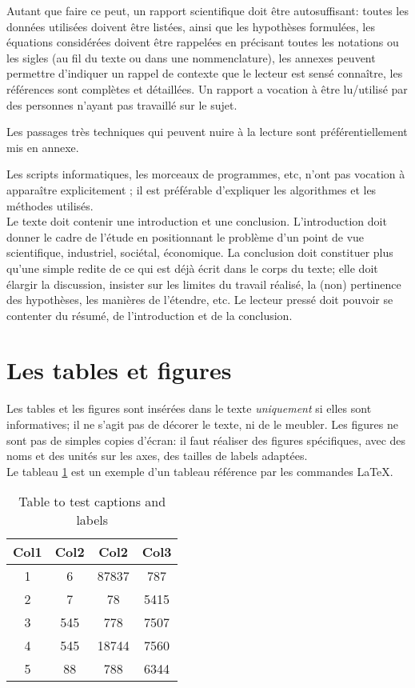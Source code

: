 \documentclass[a4paper,11pt]{paper}
\begin{document}
Autant que faire ce peut, un rapport scientifique doit être autosuffisant: toutes les données utilisées doivent être listées, ainsi que les hypothèses formulées, les équations considérées doivent être rappelées en précisant toutes les notations ou les sigles (au fil du texte ou dans une nommenclature), les annexes peuvent permettre d'indiquer un rappel de contexte que le lecteur est sensé connaître, les références sont complètes et détaillées. Un rapport a vocation à être lu/utilisé par des personnes n’ayant pas travaillé sur le sujet.

Les passages très techniques qui peuvent nuire à la lecture sont préférentiellement mis en annexe. 

Les scripts informatiques, les morceaux de programmes, etc, n'ont pas vocation à apparaître explicitement ; il est préférable d'expliquer les algorithmes et les méthodes utilisés.\\

Le texte doit contenir une introduction et une conclusion. L’introduction doit donner le cadre de l’étude en positionnant le problème d’un point de vue scientifique, industriel, sociétal, économique. La conclusion doit constituer plus qu’une simple redite de ce qui est déjà écrit dans le corps du texte; elle doit élargir la discussion, insister sur les limites du travail réalisé, la (non) pertinence des hypothèses, les manières de l’étendre, etc. Le lecteur pressé doit pouvoir se contenter du résumé, de l'introduction et de la conclusion. 

\section{Les tables et figures}

Les tables et les figures sont insérées dans le texte \emph{uniquement} si elles sont informatives; il ne s'agit pas de décorer le texte, ni de le meubler. Les figures ne sont pas de simples copies d’écran: il faut réaliser des figures spécifiques, avec des noms et des unités sur les axes, des tailles de labels adaptées. 
\\

Le tableau \ref{table:1} est un exemple d'un tableau référence par les commandes  \LaTeX.
 
\begin{table}[h!]
\centering
\begin{tabular}{||c c c c||} 
 \hline
 Col1 & Col2 & Col2 & Col3 \\ [0.5ex] 
 \hline\hline
 1 & 6 & 87837 & 787 \\ 
 2 & 7 & 78 & 5415 \\
 3 & 545 & 778 & 7507 \\
 4 & 545 & 18744 & 7560 \\
 5 & 88 & 788 & 6344 \\ [1ex] 
 \hline
\end{tabular}
\caption{Table to test captions and labels}
\label{table:1}
\end{table}
\end{document}
